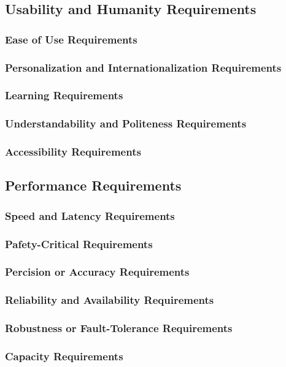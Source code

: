 \documentclass{article}
\begin{document}
\subsection{Usability and Humanity Requirements}
\subsubsection{Ease of Use Requirements}
\subsubsection{Personalization and Internationalization Requirements}
\subsubsection{Learning Requirements}
\subsubsection{Understandability and Politeness Requirements}
\subsubsection{Accessibility Requirements}

\subsection{Performance Requirements}
\subsubsection{Speed and Latency Requirements}
\subsubsection{Pafety-Critical Requirements}
\subsubsection{Percision or Accuracy Requirements}
\subsubsection{Reliability and Availability Requirements}
\subsubsection{Robustness or Fault-Tolerance Requirements}
\subsubsection{Capacity Requirements}
\end{document}

